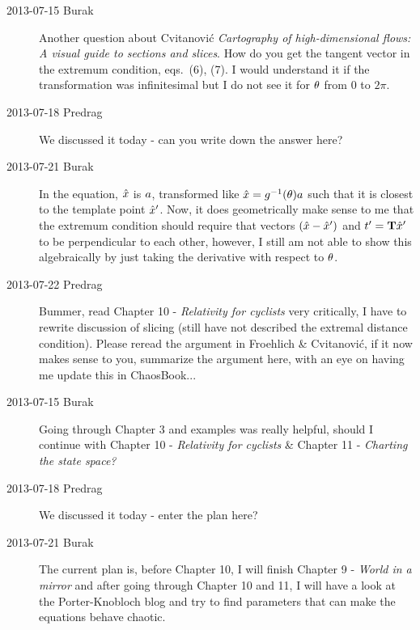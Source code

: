 \begin{description}
\item[2013-07-15  Burak]
Another question about
{Cvitanovi\'c \etal} \emph{Cartography of high-dimensional flows: A
visual guide to sections and slices}. How do you get the
tangent vector in the extremum condition, eqs.~(6), (7). I would
understand it if the transformation was infinitesimal but I do not see
it for $\theta$ from 0 to $2 \pi$.
\item[2013-07-18  Predrag]
We discussed it today - can you write down the answer here?

\item[2013-07-21  Burak] In the equation, $\hat{x}$ is $a$,
    transformed like $\hat{x} = g^{-1}(\theta) a$ such that it is closest
    to the template point ${\hat{x}'}$. Now, it does geometrically make
    sense to me that the extremum condition should require that vectors
    $(\hat{x} - {\hat{x}'})$ and $ t'_{} = \mathbf{T} {\hat{x}'}$ to be
    perpendicular to each other, however, I still am not able to show
    this algebraically by just taking the derivative with respect to
    $\theta$.
\item[2013-07-22  Predrag] Bummer, read
     {Chapter 10} -
    {\em Relativity for cyclists} very critically, I have to rewrite
discussion of slicing (still have not described the extremal distance
condition). Please reread the argument in Froehlich \&
Cvitanovi\'c, if it now makes sense to you, summarize the
argument here, with an eye on having me update this in ChaosBook...

\item[2013-07-15  Burak] Going through
     {Chapter 3} and
    examples was really helpful, should I continue with
     {Chapter 10} -
    {\em Relativity for cyclists} \&
     {Chapter 11} -
    {\em Charting the state space?}
\item[2013-07-18  Predrag]
We discussed it today - enter the plan here?

\item[2013-07-21  Burak] The current plan is, before Chapter 10, I will
    finish   {Chapter
    9} - {\em World in a mirror} and after going through Chapter 10 and
    11, I will have a look at the Porter-Knobloch blog and try to find
    parameters that can make the equations behave chaotic.


\end{description}
